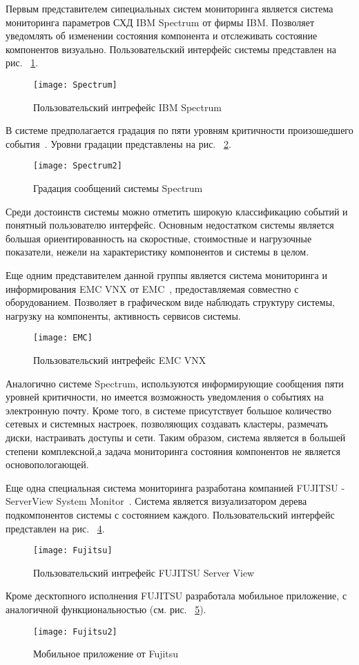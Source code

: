 Первым представителем сипециальных систем мониторинга является система мониторинга параметров СХД IBM Spectrum от фирмы IBM. Позволяет уведомлять об изменении состояния компонента и отслеживать состояние компонентов визуально. Пользовательский интерфейс системы представлен на рис. ~\ref{fig:Spectrum}.
\begin{figure}[!h]
	\centering
	\texttt{[image: Spectrum]}
	\caption{Пользовательский интрефейс IBM Spectrum}
	\label{fig:Spectrum}
\end{figure}

В системе предполагается градация по пяти уровням критичности произошедшего события~\cite{Spectrum}. Уровни градации представлены на рис. ~\ref{fig:Spectrum2}.
\begin{figure}[!h]
	\centering
	\texttt{[image: Spectrum2]}
	\caption{Градация сообщений системы Spectrum}
	\label{fig:Spectrum2}
\end{figure}
Среди достоинств системы можно отметить широкую классификацию событий и понятный пользователю интерфейс. Основным недостатком системы является большая ориентированность на скоростные, стоимостные и нагрузочные показатели, нежели на характеристику компонентов и системы в целом. 

Еще одним представителем данной группы является система мониторинга и информирования EMC VNX от EMC~\cite{EMC}, предоставляемая совместно с оборудованием. Позволяет в графическом виде наблюдать структуру системы, нагрузку на компоненты, активность сервисов системы. 
\begin{figure}[!h]
	\centering
	\texttt{[image: EMC]}
	\caption{Пользовательский интрефейс EMC VNX}
	\label{fig:EMC}
\end{figure}
Аналогично системе Spectrum, используются информирующие сообщения пяти уровней критичности, но имеется возможность уведомления о событиях на электронную почту. Кроме того, в системе присутствует большое количество сетевых и системных настроек, позволяющих создавать кластеры, размечать диски, настраивать доступы и сети. Таким образом, система является в большей степени комплексной,а задача мониторинга состояния компонентов не является основопологающей. 

Еще одна специальная система мониторинга разработана компанией FUJITSU - ServerView System Monitor~\cite{Fujitsu}. Система является визуализатором дерева подкомпонентов системы с состоянием каждого. Пользовательский интерфейс представлен на рис. ~\ref{fig:Fujitsu}.  
\begin{figure}[!h]
	\centering
	\texttt{[image: Fujitsu]}
	\caption{Пользовательский интрефейс FUJITSU Server View}
	\label{fig:Fujitsu}
\end{figure}
Кроме десктопного исполнения FUJITSU разработала мобильное приложение, с аналогичной функциональностью (см. рис. ~\ref{fig:Fujitsu2}).
\begin{figure}[!h]
	\centering
	\texttt{[image: Fujitsu2]}
	\caption{Мобильное приложение от Fujitsu}
	\label{fig:Fujitsu2}
\end{figure}


